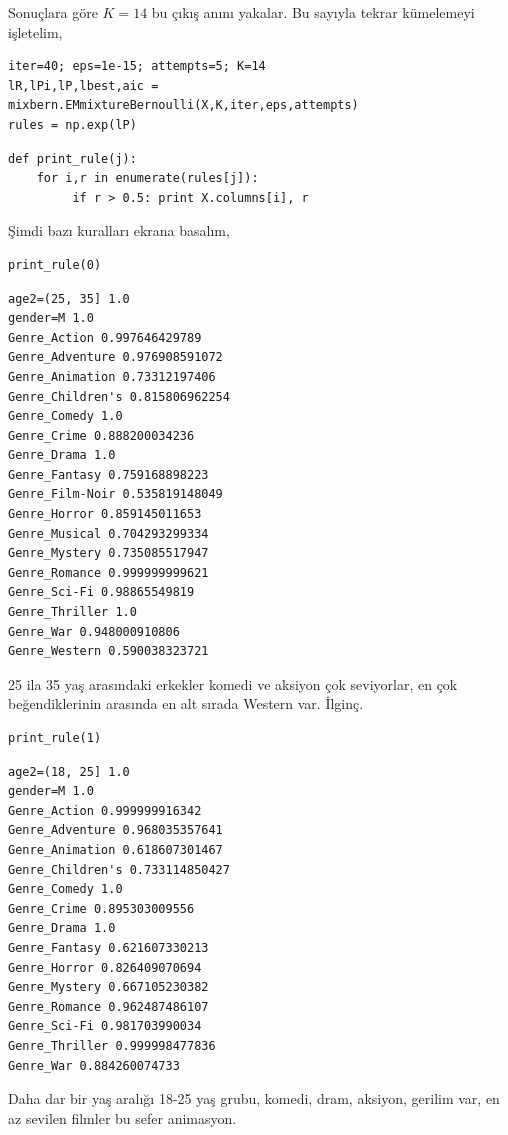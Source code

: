 \documentclass[12pt,fleqn]{article}\usepackage{../../common}
\begin{document}
Sonuçlara göre $K=14$ bu çıkış anını yakalar. Bu sayıyla tekrar kümelemeyi
işletelim,

\begin{verbatim}
iter=40; eps=1e-15; attempts=5; K=14
lR,lPi,lP,lbest,aic = mixbern.EMmixtureBernoulli(X,K,iter,eps,attempts)
rules = np.exp(lP)
\end{verbatim}

\begin{verbatim}
def print_rule(j):
    for i,r in enumerate(rules[j]): 
         if r > 0.5: print X.columns[i], r
\end{verbatim}

Şimdi bazı kuralları ekrana basalım,

\begin{verbatim}
print_rule(0)
\end{verbatim}

\begin{verbatim}
age2=(25, 35] 1.0
gender=M 1.0
Genre_Action 0.997646429789
Genre_Adventure 0.976908591072
Genre_Animation 0.73312197406
Genre_Children's 0.815806962254
Genre_Comedy 1.0
Genre_Crime 0.888200034236
Genre_Drama 1.0
Genre_Fantasy 0.759168898223
Genre_Film-Noir 0.535819148049
Genre_Horror 0.859145011653
Genre_Musical 0.704293299334
Genre_Mystery 0.735085517947
Genre_Romance 0.999999999621
Genre_Sci-Fi 0.98865549819
Genre_Thriller 1.0
Genre_War 0.948000910806
Genre_Western 0.590038323721
\end{verbatim}

25 ila 35 yaş arasındaki erkekler komedi ve aksiyon çok seviyorlar, en çok
beğendiklerinin arasında en alt sırada Western var. İlginç.

\begin{verbatim}
print_rule(1)
\end{verbatim}

\begin{verbatim}
age2=(18, 25] 1.0
gender=M 1.0
Genre_Action 0.999999916342
Genre_Adventure 0.968035357641
Genre_Animation 0.618607301467
Genre_Children's 0.733114850427
Genre_Comedy 1.0
Genre_Crime 0.895303009556
Genre_Drama 1.0
Genre_Fantasy 0.621607330213
Genre_Horror 0.826409070694
Genre_Mystery 0.667105230382
Genre_Romance 0.962487486107
Genre_Sci-Fi 0.981703990034
Genre_Thriller 0.999998477836
Genre_War 0.884260074733
\end{verbatim}

Daha dar bir yaş aralığı 18-25 yaş grubu, komedi, dram, aksiyon, gerilim
var, en az sevilen filmler bu sefer animasyon.
\end{document}
